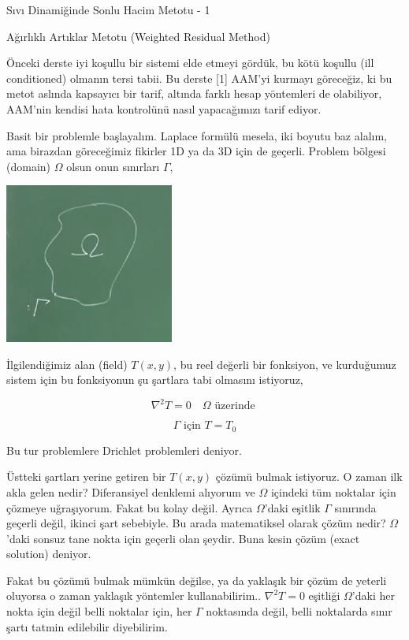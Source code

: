 \documentclass[12pt,fleqn]{article}\usepackage{../../common}
\begin{document}
Sıvı Dinamiğinde Sonlu Hacim Metotu - 1

Ağırlıklı Artıklar Metotu (Weighted Residual Method)

Önceki derste iyi koşullu bir sistemi elde etmeyi gördük, bu kötü koşullu (ill
conditioned) olmanın tersi tabii. Bu derste [1] AAM'yi kurmayı göreceğiz, ki bu
metot aslında kapsayıcı bir tarif, altında farklı hesap yöntemleri de
olabiliyor, AAM'nin kendisi hata kontrolünü nasıl yapacağımızı tarif ediyor.

Basit bir problemle başlayalım. Laplace formülü mesela, iki boyutu baz alalım,
ama birazdan göreceğimiz fikirler 1D ya da 3D için de geçerli. Problem bölgesi
(domain) $\Omega$ olsun onun sınırları $\Gamma$, 

\includegraphics[width=15em]{compscieng_app45aerofem1_01.png}

İlgilendiğimiz alan (field) $T(x,y)$, bu reel değerli bir fonksiyon, ve
kurduğumuz sistem için bu fonksiyonun şu şartlara tabi olmasını istiyoruz,

$$
\nabla^2 T = 0 \quad \Omega \textrm{ üzerinde } 
$$

$$
\Gamma \textrm{ için } T = T_0
$$

Bu tur problemlere Drichlet problemleri deniyor.

Üstteki şartları yerine getiren bir $T(x,y)$ çözümü bulmak istiyoruz. O zaman
ilk akla gelen nedir? Diferansiyel denklemi alıyorum ve $\Omega$ içindeki tüm
noktalar için çözmeye uğraşıyorum. Fakat bu kolay değil. Ayrıca $\Omega$'daki
eşitlik $\Gamma$ sınırında geçerli değil, ikinci şart sebebiyle. Bu arada
matematiksel olarak çözüm nedir? $\Omega$'daki sonsuz tane nokta için geçerli
olan şeydir. Buna kesin çözüm (exact solution) deniyor. 

Fakat bu çözümü bulmak mümkün değilse, ya da yaklaşık bir çözüm de yeterli
oluyorsa o zaman yaklaşık yöntemler kullanabilirim.. $\nabla^2 T = 0 $ eşitliği
$\Omega$'daki her nokta için değil belli noktalar için, her $\Gamma$ noktasında
değil, belli noktalarda sınır şartı tatmin edilebilir diyebilirim.
\end{document}
